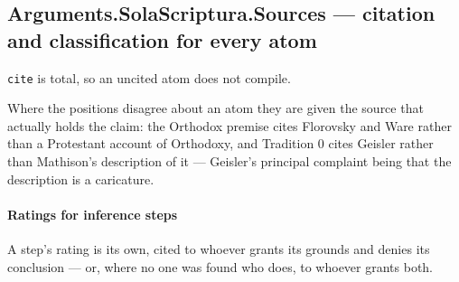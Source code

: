 \documentclass[11pt]{article}
\begin{document}
\subsection*{Arguments.SolaScriptura.Sources — citation and classification for every atom}
\texttt{cite} is total, so an uncited atom does not compile.

Where the positions disagree about an atom they are given the source that actually holds the claim: the Orthodox premise cites Florovsky and Ware rather than a Protestant account of Orthodoxy, and Tradition 0 cites Geisler rather than Mathison's description of it — Geisler's principal complaint being that the description is a caricature.

\paragraph*{Ratings for inference steps}
\leavevmode\par
A step's rating is its own, cited to whoever grants its grounds and denies its conclusion — or, where no one was found who does, to whoever grants both.
\end{document}

